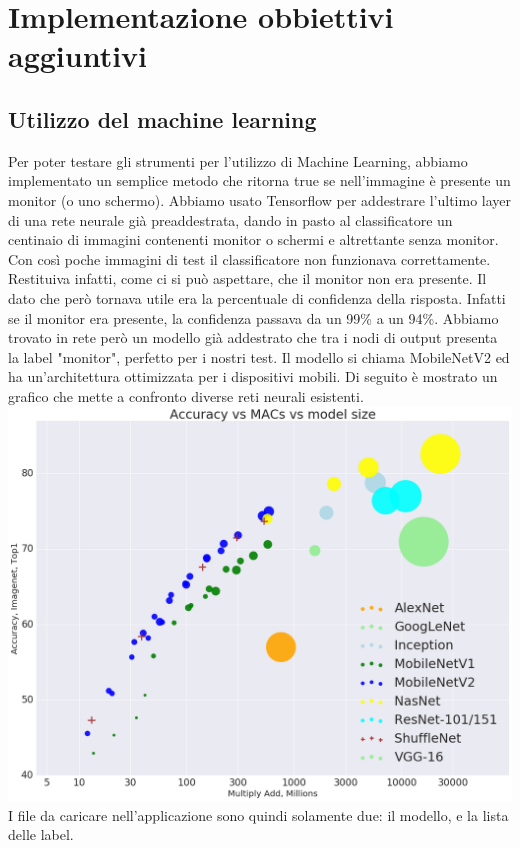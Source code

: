 \documentclass[twoside]{supsistudent}
\newcommand{\Decaa}{\newline\vspace{0.5mm}\newline\noindent}
\begin{document}
\newpage
\section{Implementazione obbiettivi aggiuntivi}%
\subsection{Utilizzo del machine learning}
Per poter testare gli strumenti per l'utilizzo di Machine Learning, abbiamo implementato un semplice metodo che ritorna true se nell'immagine è presente un monitor (o uno schermo). Abbiamo usato Tensorflow per addestrare l'ultimo layer di una rete neurale già preaddestrata, dando in pasto al classificatore un centinaio di immagini contenenti monitor o schermi e altrettante senza monitor. Con così poche immagini di test il classificatore non funzionava correttamente. Restituiva infatti, come ci si può aspettare, che il monitor non era presente. Il dato che però tornava utile era la percentuale di confidenza della risposta. Infatti se il monitor era presente, la confidenza passava da un 99\% a un 94\%. 
Abbiamo trovato in rete però un modello già addestrato che tra i nodi di output presenta la label "monitor", perfetto per i nostri test. Il modello si chiama MobileNetV2 ed ha un'architettura ottimizzata per i dispositivi mobili. Di seguito è mostrato un grafico che mette a confronto diverse reti neurali esistenti.
\Decaa
\includegraphics[width=\textwidth]{Pictures/accuracy.PNG}
\Decaa
I file da caricare nell'applicazione sono quindi solamente due: il modello, e la lista delle label. 
\end{document}
